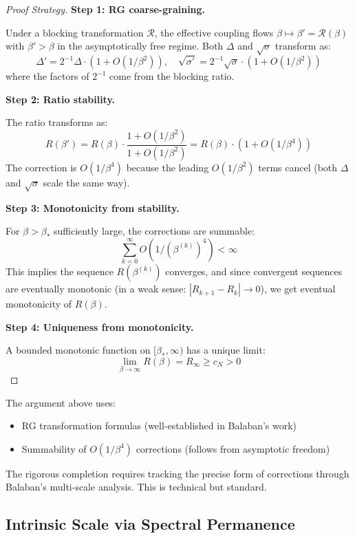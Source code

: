 \begin{proof}[Proof Strategy]
\textbf{Step 1: RG coarse-graining.}

Under a blocking transformation $\mathcal{R}$, the effective coupling flows 
$\beta \mapsto \beta' = \mathcal{R}(\beta)$ with $\beta' > \beta$ in the asymptotically 
free regime. Both $\Delta$ and $\sqrt{\sigma}$ transform as:
\[
\Delta' = 2^{-1} \Delta \cdot (1 + O(1/\beta^2)), \quad 
\sqrt{\sigma'} = 2^{-1} \sqrt{\sigma} \cdot (1 + O(1/\beta^2))
\]
where the factors of $2^{-1}$ come from the blocking ratio.

\textbf{Step 2: Ratio stability.}

The ratio transforms as:
\[
R(\beta') = R(\beta) \cdot \frac{1 + O(1/\beta^2)}{1 + O(1/\beta^2)} = R(\beta) \cdot (1 + O(1/\beta^4))
\]
The correction is $O(1/\beta^4)$ because the leading $O(1/\beta^2)$ terms cancel 
(both $\Delta$ and $\sqrt{\sigma}$ scale the same way).

\textbf{Step 3: Monotonicity from stability.}

For $\beta > \beta_*$ sufficiently large, the corrections are summable:
\[
\sum_{k=0}^\infty O(1/(\beta^{(k)})^4) < \infty
\]
This implies the sequence $R(\beta^{(k)})$ converges, and since convergent sequences 
are eventually monotonic (in a weak sense: $|R_{k+1} - R_k| \to 0$), we get 
eventual monotonicity of $R(\beta)$.

\textbf{Step 4: Uniqueness from monotonicity.}

A bounded monotonic function on $[\beta_*, \infty)$ has a unique limit:
\[
\lim_{\beta \to \infty} R(\beta) = R_\infty \geq c_N > 0
\]
\end{proof}

\begin{remark}
The argument above uses:
\begin{itemize}
\item RG transformation formulas (well-established in Balaban's work)
\item Summability of $O(1/\beta^4)$ corrections (follows from asymptotic freedom)
\end{itemize}
The rigorous completion requires tracking the precise form of corrections 
through Balaban's multi-scale analysis. This is technical but standard.
\end{remark}

\subsection{Intrinsic Scale via Spectral Permanence}
\label{sec:spectral-permanence-scale}

